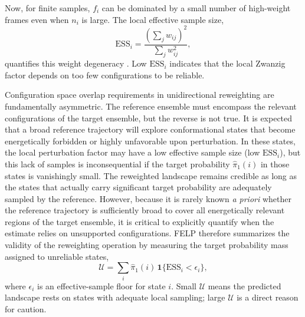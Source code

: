 \documentclass[journal=jctcce,manuscript=article,layout=twocolumn,hyperref=true]{achemso}
\begin{document}
	Now, for finite samples, $f_i$ can be dominated by a small number of high-weight frames even when $n_i$ is large. The local effective sample size,
	\begin{equation}
		\mathrm{ESS}_i = \frac{\left(\sum_j w_{ij}\right)^2}{\sum_j w_{ij}^2},
	\end{equation}
	quantifies this weight degeneracy \cite{kong1992importance,elvira2022ess}. Low $\mathrm{ESS}_i$ indicates that the local Zwanzig factor depends on too few configurations to be reliable.
	
	Configuration space overlap requirements in unidirectional reweighting are fundamentally asymmetric. The reference ensemble must encompass the relevant configurations of the target ensemble, but the reverse is not true. It is expected that a broad reference trajectory will explore conformational states that become energetically forbidden or highly unfavorable upon perturbation. In these states, the local perturbation factor may have a low effective sample size (low $\mathrm{ESS}_i$), but this lack of samples is inconsequential if the target probability $\hat{\pi}_1(i)$ in those states is vanishingly small. The reweighted landscape remains credible as long as the states that actually carry significant target probability are adequately sampled by the reference. However, because it is rarely known \textit{a priori} whether the reference trajectory is sufficiently broad to cover all energetically relevant regions of the target ensemble, it is critical to explicitly quantify when the estimate relies on unsupported configurations. FELP therefore summarizes the validity of the reweighting operation by measuring the target probability mass assigned to unreliable states,
	\begin{equation}
		\mathcal{U} =
		\sum_i \hat{\pi}_1(i)\,
		\mathbf{1}\{\mathrm{ESS}_i < \epsilon_i\},
		\label{eq:unreliable_mass}
	\end{equation}
	where $\epsilon_i$ is an effective-sample floor for state $i$. Small $\mathcal{U}$ means the predicted landscape rests on states with adequate local sampling; large $\mathcal{U}$ is a direct reason for caution.
	
\end{document}
